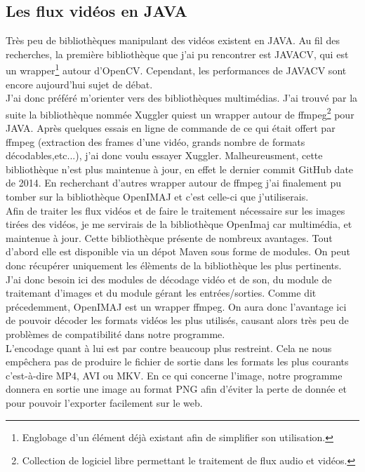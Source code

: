 \documentclass[10pt,a4paper]{article}
\begin{document}
\subsection{Les flux vidéos en JAVA}

Très peu de bibliothèques manipulant des vidéos existent en JAVA. Au fil des recherches, la première bibliothèque que j'ai pu rencontrer est JAVACV, qui est un wrapper\footnote{Englobage d'un élément déjà existant
afin de simplifier son utilisation.} autour d'OpenCV. Cependant, les performances de JAVACV sont encore aujourd'hui sujet de débat.\\

J'ai donc préféré m'orienter vers des bibliothèques multimédias. J'ai trouvé par la suite la bibliothèque nommée Xuggler quiest un wrapper autour de
ffmpeg\footnote{Collection de logiciel libre permettant le traitement de flux audio et vidéos.} pour JAVA. Après quelques essais en ligne de commande de ce qui était offert
par ffmpeg (extraction des frames d'une vidéo, grands nombre de formats décodables,etc...), j'ai donc voulu essayer Xuggler. Malheureusment, cette bibliothèque n'est plus maintenue à jour, en effet le dernier
commit GitHub date de 2014. En recherchant d'autres wrapper autour de ffmpeg j'ai finalement pu tomber sur la bibliothèque OpenIMAJ et c'est celle-ci que j'utiliserais.\\

Afin de traiter les flux vidéos et de faire le traitement nécessaire sur les images tirées des vidéos, je me servirais de  la bibliothèque OpenImaj car multimédia, et maintenue à jour.
Cette bibliothèque présente de nombreux avantages. Tout d'abord elle est
disponible via un dépot Maven sous forme de modules. On peut donc récupérer uniquement les élèments de la bibliothèque
les plus pertinents. J'ai donc besoin ici des modules de décodage vidéo et de son, du module de traitemant d'images
et du module gérant les entrées/sorties.
Comme dit précedemment, OpenIMAJ est un wrapper ffmpeg. On aura donc l'avantage ici de pouvoir décoder les formats vidéos
les plus utilisés, causant alors très peu de problèmes de compatibilité dans notre
programme.\\

L'encodage quant à lui est par contre beaucoup plus restreint. Cela ne nous empêchera pas de produire
le fichier de sortie dans les formats les plus courants c'est-à-dire MP4, AVI ou MKV.
En ce qui concerne l'image, notre programme donnera en sortie une image au format PNG afin d'éviter la perte de donnée et
pour pouvoir l'exporter facilement sur le web.
\end{document}
